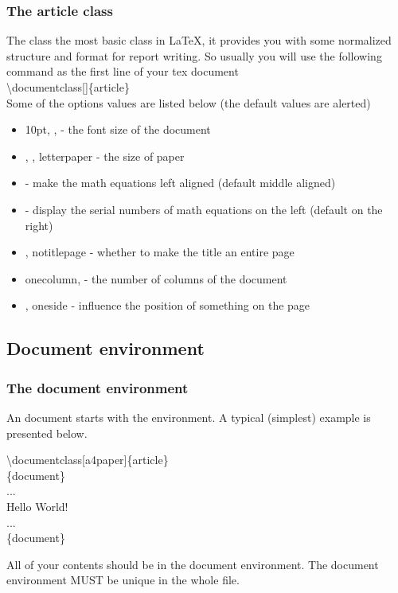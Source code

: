 \documentclass{beamer}
\newcommand{\samplebegin}[1]{\structure{\textbackslash begin}\{#1\}}
\newcommand{\sampleend}[1]{\structure{\textbackslash end}\{#1\}}
\newcommand{\samplecommand}[1]{\alert{\textbackslash #1}}
\begin{document}
\begin{frame}
	\frametitle{The article class}
	The  class the most basic class in \LaTeX, it provides you with some normalized structure and format for report writing. So usually you will use the following command as the first line of your tex document\\[0.5em]
	\samplecommand{documentclass}[]\{article\}\\[0.5em]
	Some of the options values are listed below (the default values are \alert{alerted})
	\begin{itemize}
		\item \alert{10pt}, \structure{11pt}, \structure{12pt} - the font size of the document
		\item {}, , \alert{letterpaper} - the size of paper
		\item {} - make the math equations left aligned (default middle aligned)
		\item {} - display the serial numbers of math equations on the left (default on the right)
		\item {}, \alert{notitlepage} - whether to make the title an entire page
		\item \alert{onecolumn},  - the number of columns of the document
		\item {}, \alert{oneside} - influence the position of something on the page
	\end{itemize}
\end{frame}


\subsection{Document environment}

\begin{frame}
	\frametitle{The document environment}
	\begin{definition}
		An document starts with the  environment. A typical  (simplest) example is presented below.
	\end{definition}
	\begin{example}
		\samplecommand{documentclass}[a4paper]\{article\}\\
		\samplebegin{document}\\
		\qquad...\\
		\qquad Hello World!\\
		\qquad...\\
		\sampleend{document}\\
	\end{example}

	All of your contents should be in the document environment. The document environment \alert{MUST} be \alert{unique} in the whole file.
\end{frame}
\end{document}
